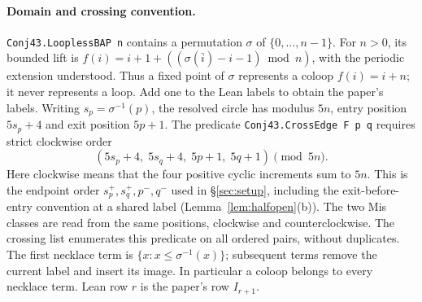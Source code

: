\documentclass[11pt]{article}
\theoremstyle{definition}
\begin{document}
\paragraph{Domain and crossing convention.}
\texttt{Conj43.\allowbreak LooplessBAP n} contains a permutation $\sigma$ of
$\{0,\ldots,n-1\}$. For $n>0$, its bounded lift is
$f(i)=i+1+((\sigma(\bar i)-i-1)\bmod n)$, with the periodic extension understood.
Thus a fixed point of $\sigma$ represents a coloop $f(i)=i+n$; it never
represents a loop. Add one to the Lean labels to obtain the paper's labels.
Writing $s_p=\sigma^{-1}(p)$, the resolved circle has modulus $5n$, entry
position $5s_p+4$ and exit position $5p+1$. The predicate
\texttt{Conj43.\allowbreak CrossEdge F p q} requires strict clockwise order
\[
 (5s_p+4,\;5s_q+4,\;5p+1,\;5q+1)\pmod{5n}.
\]
Here clockwise means that the four positive cyclic increments sum to $5n$.
This is the endpoint order $s_p^+,s_q^+,p^-,q^-$ used in \S\ref{sec:setup},
including the exit-before-entry convention at a shared label
(Lemma~\ref{lem:halfopen}(b)). The two Mis classes are read from the same positions, clockwise and
counterclockwise.
The crossing list enumerates this predicate on all ordered pairs, without
duplicates. The first necklace term is $\{x:x\le\sigma^{-1}(x)\}$; subsequent
terms remove the current label and insert its image. In particular a coloop
belongs to every necklace term. Lean row $r$ is the paper's row $I_{r+1}$.
\end{document}
